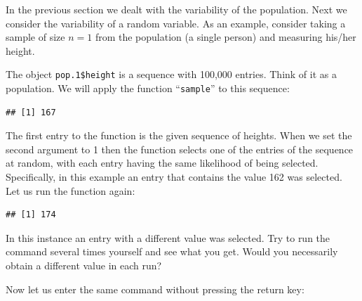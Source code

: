 \documentclass[]{krantz}
\makeatletter
\newenvironment{Shaded}{\begin{snugshade}}{\end{snugshade}}
\newcommand{\KeywordTok}[1]{\textcolor[rgb]{0.13,0.29,0.53}{\textbf{#1}}}
\newcommand{\DecValTok}[1]{\textcolor[rgb]{0.00,0.00,0.81}{#1}}
\newcommand{\OperatorTok}[1]{\textcolor[rgb]{0.81,0.36,0.00}{\textbf{#1}}}
\newcommand{\NormalTok}[1]{#1}
\newenvironment{kframe}{%
\medskip{}
\setlength{\fboxsep}{.8em}
 \def\at@end@of@kframe{}%
 \ifinner\ifhmode%
  \def\at@end@of@kframe{\end{minipage}}%
  \begin{minipage}{\columnwidth}%
 \fi\fi%
 \def\FrameCommand##1{\hskip\@totalleftmargin \hskip-\fboxsep
 \colorbox{shadecolor}{##1}\hskip-\fboxsep
     \hskip-\linewidth \hskip-\@totalleftmargin \hskip\columnwidth}%
 \MakeFramed {\advance\hsize-\width
   \@totalleftmargin\z@ \linewidth\hsize
   \@setminipage}}%
 {\par\unskip\endMakeFramed%
 \at@end@of@kframe}
\renewenvironment{Shaded}{\begin{kframe}}{\end{kframe}}
\theoremstyle{definition}
\theoremstyle{definition}
\theoremstyle{definition}
\theoremstyle{remark}
\makeatother
\begin{document}
In the previous section we dealt with the variability of the population.
Next we consider the variability of a random variable. As an example,
consider taking a sample of size \(n=1\) from the population (a single
person) and measuring his/her height.

The object \texttt{pop.1\$height} is a sequence with 100,000 entries.
Think of it as a population. We will apply the function
``\texttt{sample}'' to this sequence:

\begin{Shaded}
\end{Shaded}

\begin{verbatim}
## [1] 167
\end{verbatim}

The first entry to the function is the given sequence of heights. When
we set the second argument to 1 then the function selects one of the
entries of the sequence at random, with each entry having the same
likelihood of being selected. Specifically, in this example an entry
that contains the value 162 was selected. Let us run the function again:

\begin{Shaded}
\end{Shaded}

\begin{verbatim}
## [1] 174
\end{verbatim}

In this instance an entry with a different value was selected. Try to
run the command several times yourself and see what you get. Would you
necessarily obtain a different value in each run?

Now let us enter the same command without pressing the return key:

\begin{Shaded}
\end{Shaded}
\end{document}
